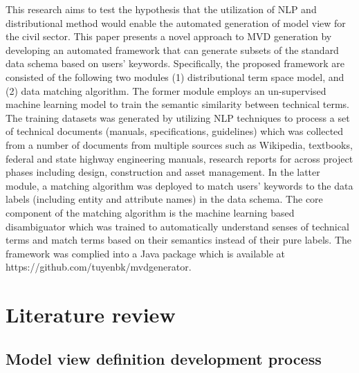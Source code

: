 \documentclass[Journal, InsideFigs, DoubleSpace]{ascelike} %
\begin{document}
This research aims to test the hypothesis that the utilization of NLP and distributional method would enable the automated generation of model view for the civil sector. This paper presents a novel approach to MVD generation by developing an automated framework that can generate subsets of the standard data schema based on users' keywords. Specifically, the proposed framework are consisted of the following two modules (1) distributional term space model, and (2) data matching algorithm. The former module employs an un-supervised machine learning model to train the semantic similarity between technical terms. The training datasets was generated by utilizing NLP techniques to process a set of technical documents (manuals, specifications, guidelines) which was collected from a number of documents from multiple sources such as Wikipedia, textbooks, federal and state highway engineering manuals, research reports for across project phases including design, construction and asset management. In the latter module, a matching algorithm was deployed to match users' keywords to the data labels (including entity and attribute names) in the data schema. The core component of the matching algorithm is the machine learning based disambiguator which was trained to automatically understand senses of technical terms and match terms based on their semantics instead of their pure labels. The framework was complied into a Java package which is available at https://github.com/tuyenbk/mvdgenerator.
%
\section{Literature review} \label{sec:litrev} %


\subsection{Model view definition development process}
\end{document}
